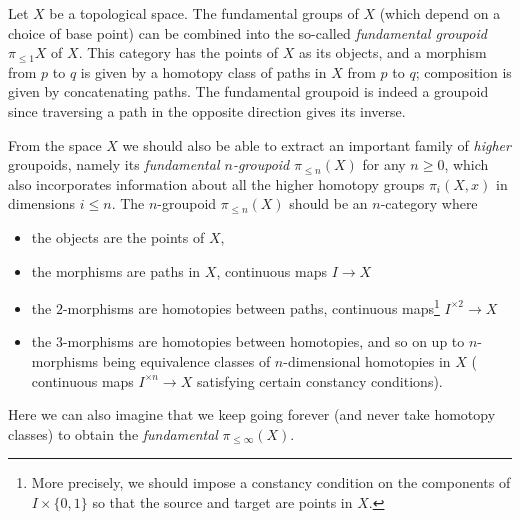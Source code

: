 \documentclass[a4paper,11pt]{article}
\begin{document}
\begin{defn}\label{ex:fundgpd}
  Let $X$ be a topological space. The fundamental groups of $X$ (which
  depend on a choice of base point) can be combined into the so-called
  \emph{fundamental groupoid} $\pi_{\leq 1}X$ of $X$. This category
  has the points of $X$ as its objects, and a morphism from $p$ to $q$
  is given by a homotopy class of paths in $X$ from $p$ to $q$;
  composition is given by concatenating paths. The fundamental
  groupoid is indeed a groupoid since traversing a path in the
  opposite direction gives its inverse.
\end{defn}

From the space $X$ we should also be able to extract an important
family of \emph{higher} groupoids, namely its \emph{fundamental $n$-groupoid}
$\pi_{\leq n}(X)$ for any $n \geq 0$, which also incorporates
information about all the higher
homotopy groups $\pi_{i}(X,x)$ in dimensions $i \leq n$. The
$n$-groupoid $\pi_{\leq n}(X)$ should be an $n$-category where
\begin{itemize}
\item the objects are the points of $X$, 
\item the morphisms are paths in $X$, \ie{} continuous maps $I \to X$
\item the $2$-morphisms are
homotopies between paths, \ie{} continuous maps\footnote{More
  precisely, we should impose a constancy condition on the components
  of $I \times \{0,1\}$ so that the source and target are points in $X$.} $I^{\times 2} \to X$
\item the $3$-morphisms are homotopies between
homotopies, and so on up to $n$-morphisms being equivalence classes of
$n$-dimensional homotopies in $X$ (\ie{} continuous maps
$I^{\times n} \to X$ satisfying certain constancy conditions).
\end{itemize}
Here we can also imagine that we keep going forever (and never take
homotopy classes) to obtain the \emph{fundamental \igpd{}}
$\pi_{\leq \infty}(X)$.
\end{document}
